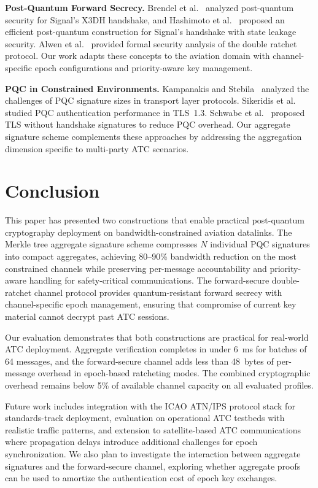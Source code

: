 \documentclass[conference,10pt]{IEEEtran}
\begin{document}
\textbf{Post-Quantum Forward Secrecy.} Brendel et al.~\cite{brendel2020pqsignal} analyzed post-quantum security for Signal's X3DH handshake, and Hashimoto et al.~\cite{hashimoto2021pqratchet} proposed an efficient post-quantum construction for Signal's handshake with state leakage security. Alwen et al.~\cite{alwen2020double} provided formal security analysis of the double ratchet protocol. Our work adapts these concepts to the aviation domain with channel-specific epoch configurations and priority-aware key management.

\textbf{PQC in Constrained Environments.} Kampanakis and Stebila~\cite{kampanakis2023pqsize} analyzed the challenges of PQC signature sizes in transport layer protocols. Sikeridis et al.~\cite{sikeridis2020pqtls} studied PQC authentication performance in TLS~1.3. Schwabe et al.~\cite{schwabe2021pqembedded} proposed TLS without handshake signatures to reduce PQC overhead. Our aggregate signature scheme complements these approaches by addressing the aggregation dimension specific to multi-party ATC scenarios.

\section{Conclusion}
\label{sec:conclusion}

This paper has presented two constructions that enable practical post-quantum cryptography deployment on bandwidth-constrained aviation datalinks. The Merkle tree aggregate signature scheme compresses $N$ individual PQC signatures into compact aggregates, achieving 80--90\% bandwidth reduction on the most constrained channels while preserving per-message accountability and priority-aware handling for safety-critical communications. The forward-secure double-ratchet channel protocol provides quantum-resistant forward secrecy with channel-specific epoch management, ensuring that compromise of current key material cannot decrypt past ATC sessions.

Our evaluation demonstrates that both constructions are practical for real-world ATC deployment. Aggregate verification completes in under 6~ms for batches of 64 messages, and the forward-secure channel adds less than 48~bytes of per-message overhead in epoch-based ratcheting modes. The combined cryptographic overhead remains below 5\% of available channel capacity on all evaluated profiles.

Future work includes integration with the ICAO ATN/IPS protocol stack for standards-track deployment, evaluation on operational ATC testbeds with realistic traffic patterns, and extension to satellite-based ATC communications where propagation delays introduce additional challenges for epoch synchronization. We also plan to investigate the interaction between aggregate signatures and the forward-secure channel, exploring whether aggregate proofs can be used to amortize the authentication cost of epoch key exchanges.



\end{document}
